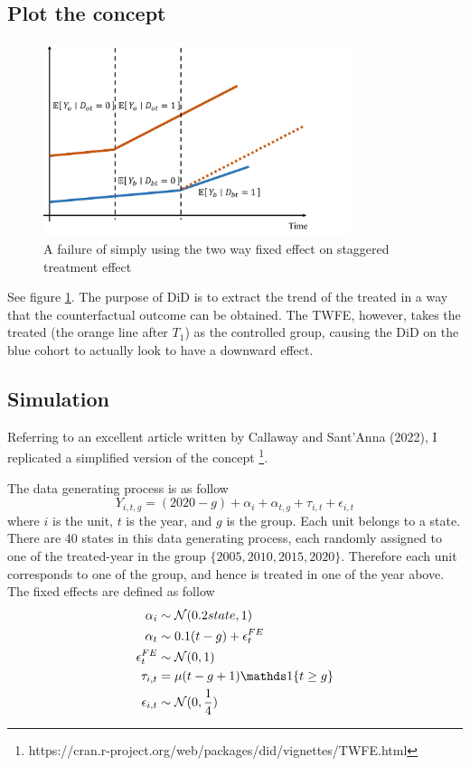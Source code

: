 \subsection{Plot the concept}
\begin{figure}[h!]
    \centering
    \includegraphics[width=0.8\textwidth]{fig/TWFE_fig.png}
    \caption{A failure of simply using the two way fixed effect on staggered treatment effect}
    \label{fig:TWFE_1}
\end{figure}

See figure \ref{fig:TWFE_1}. The purpose of DiD is to extract the trend 
of the treated in a way that the counterfactual outcome can be obtained. 
The TWFE, however, takes the treated (the orange line after $T_1$) as the controlled group, 
causing the DiD on the blue cohort to actually look to have a downward effect.

\subsection{Simulation}

Referring to an excellent article written by Callaway and Sant’Anna (2022), 
I replicated a simplified version of the concept \footnote{https://cran.r-project.org/web/packages/did/vignettes/TWFE.html}.

The data generating process is as follow
\begin{equation*}
    Y_{i,t,g} = (2020-g) + \alpha_i + \alpha_{t,g} + \tau_{i,t} + \epsilon_{i,t} 
\end{equation*}
where $i$ is the unit, $t$ is the year, and $g$ is the group. Each unit belongs to a state. 
There are 40 states in this data generating process, 
each randomly assigned to one of the treated-year in the group $\{2005, 2010, 2015, 2020\}$. 
Therefore each unit corresponds to one of the group, and hence is treated in one of the year above.
The fixed effects are defined as follow 
\begin{align*}
    \alpha_i &\sim \mathcal{N}(0.2 state, 1) \\
    \alpha_t &\sim 0.1(t-g) + \epsilon^{FE}_{t} \\
    \epsilon^{FE}_{t} &\sim \mathcal{N}(0,1)\\
    \tau_{i,t} &= \mu (t - g + 1) \one\{t \ge g\}\\
    \epsilon_{i,t} &\sim \mathcal{N}(0,\frac{1}{4}) 
\end{align*}

